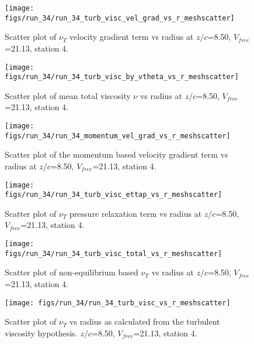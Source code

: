 \begin{figure}[H]
\centering
\texttt{[image: figs/run\_34/run\_34\_turb\_visc\_vel\_grad\_vs\_r\_meshscatter]}
\caption{Scatter plot of $\nu_T$ velocity gradient term vs radius at $z/c$=8.50, $V_{free}$=21.13, station 4.}
\end{figure}


\begin{figure}[H]
\centering
\texttt{[image: figs/run\_34/run\_34\_turb\_visc\_by\_vtheta\_vs\_r\_meshscatter]}
\caption{Scatter plot of mean total viscosity $\nu$ vs radius at $z/c$=8.50, $V_{free}$=21.13, station 4.}
\end{figure}


\begin{figure}[H]
\centering
\texttt{[image: figs/run\_34/run\_34\_momentum\_vel\_grad\_vs\_r\_meshscatter]}
\caption{Scatter plot of the momentum based velocity gradient term vs radius at $z/c$=8.50, $V_{free}$=21.13, station 4.}
\end{figure}


\begin{figure}[H]
\centering
\texttt{[image: figs/run\_34/run\_34\_turb\_visc\_ettap\_vs\_r\_meshscatter]}
\caption{Scatter plot of $\nu_T$ pressure relaxation term vs radius at $z/c$=8.50, $V_{free}$=21.13, station 4.}
\end{figure}


\begin{figure}[H]
\centering
\texttt{[image: figs/run\_34/run\_34\_turb\_visc\_total\_vs\_r\_meshscatter]}
\caption{Scatter plot of non-equilibrium based $\nu_T$ vs radius at $z/c$=8.50, $V_{free}$=21.13, station 4.}
\end{figure}


\begin{figure}[H]
\centering
\texttt{[image: figs/run\_34/run\_34\_turb\_visc\_vs\_r\_meshscatter]}
\caption{Scatter plot of $\nu_T$ vs radius as calculated from the turbulent viscosity hypothesis. $z/c$=8.50, $V_{free}$=21.13, station 4.}
\end{figure}


